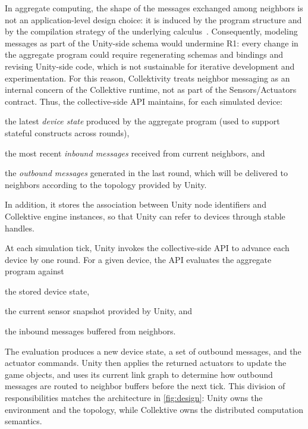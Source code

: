 In aggregate computing, the shape of the messages exchanged among neighbors is not an application-level design choice:
it is induced by the program structure and by the compilation strategy of the underlying calculus~\cite{DBLP:journals/tocl/AudritoVDPB19}.
%
Consequently, modeling messages as part of the Unity-side schema would undermine R1:
every change in the aggregate program could require regenerating schemas and bindings and revising Unity-side code,
which is not sustainable for iterative development and experimentation.
%
For this reason, Collektivity treats neighbor messaging as an internal concern of the Collektive runtime, not as part of the
Sensors/Actuators contract.
%
Thus, the collective-side \ac{API} maintains, for each simulated device:
\begin{inlinelist}
    \item the latest \emph{device state} produced by the aggregate program (used to support stateful constructs across rounds),
    \item the most recent \emph{inbound messages} received from current neighbors, and
    \item the \emph{outbound messages} generated in the last round, which will be delivered to neighbors according to the topology provided by Unity.
\end{inlinelist}
In addition, it stores the association between Unity node identifiers and Collektive engine instances,
so that Unity can refer to devices through stable handles.

At each simulation tick, Unity invokes the collective-side \ac{API} to advance each device by one round.
For a given device, the \ac{API} evaluates the aggregate program against
\begin{inlinelist}
    \item the stored device state,
    \item the current sensor snapshot provided by Unity,
    and
    \item the inbound messages buffered from neighbors.
\end{inlinelist}
%
The evaluation produces a new device state, a set of outbound messages, and the actuator commands.
%
Unity then applies the returned actuators to update the game objects, and uses its current link graph to determine how outbound messages
are routed to neighbor buffers before the next tick.
%
This division of responsibilities matches the architecture in \cref{fig:design}:
Unity owns the environment and the topology,
while Collektive owns the distributed computation semantics.

